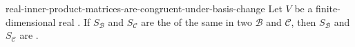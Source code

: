 \documentclass[preview]{standalone}
\begin{document}
\begin{snippet}{real-inner-product-matrices-are-congruent-under-basis-change}
    Let \(V\) be a finite-dimensional real \innerproductspace. If
    \(S_{\mathcal{B}}\) and \(S_{\mathcal{C}}\) are the
     of the same \innerproduct in two
    \basis[bases] \(\mathcal{B}\) and \(\mathcal{C}\), then
    \(S_{\mathcal{B}}\) and \(S_{\mathcal{C}}\) are \congruentmatrices.
\end{snippet}
\end{document}
